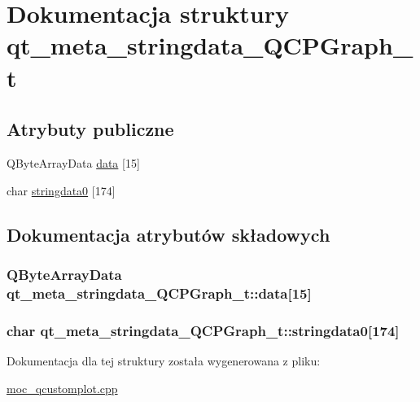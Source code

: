 \hypertarget{structqt__meta__stringdata___q_c_p_graph__t}{}\section{Dokumentacja struktury qt\+\_\+meta\+\_\+stringdata\+\_\+\+Q\+C\+P\+Graph\+\_\+t}
\label{structqt__meta__stringdata___q_c_p_graph__t}
\subsection*{Atrybuty publiczne}
\begin{DoxyCompactItemize}
\item 
Q\+Byte\+Array\+Data \hyperlink{structqt__meta__stringdata___q_c_p_graph__t_a070d55ece907072898e987f8594e5776}{data} \mbox{[}15\mbox{]}
\item 
char \hyperlink{structqt__meta__stringdata___q_c_p_graph__t_a50b082c96ddea75773a05144ba6d44ca}{stringdata0} \mbox{[}174\mbox{]}
\end{DoxyCompactItemize}


\subsection{Dokumentacja atrybutów składowych}
\subsubsection[{\texorpdfstring{data}{data}}]{\setlength{\rightskip}{0pt plus 5cm}Q\+Byte\+Array\+Data qt\+\_\+meta\+\_\+stringdata\+\_\+\+Q\+C\+P\+Graph\+\_\+t\+::data\mbox{[}15\mbox{]}}\hypertarget{structqt__meta__stringdata___q_c_p_graph__t_a070d55ece907072898e987f8594e5776}{}\label{structqt__meta__stringdata___q_c_p_graph__t_a070d55ece907072898e987f8594e5776}
\subsubsection[{\texorpdfstring{stringdata0}{stringdata0}}]{\setlength{\rightskip}{0pt plus 5cm}char qt\+\_\+meta\+\_\+stringdata\+\_\+\+Q\+C\+P\+Graph\+\_\+t\+::stringdata0\mbox{[}174\mbox{]}}\hypertarget{structqt__meta__stringdata___q_c_p_graph__t_a50b082c96ddea75773a05144ba6d44ca}{}\label{structqt__meta__stringdata___q_c_p_graph__t_a50b082c96ddea75773a05144ba6d44ca}


Dokumentacja dla tej struktury została wygenerowana z pliku\+:\begin{DoxyCompactItemize}
\item 
\hyperlink{moc__qcustomplot_8cpp}{moc\+\_\+qcustomplot.\+cpp}\end{DoxyCompactItemize}
